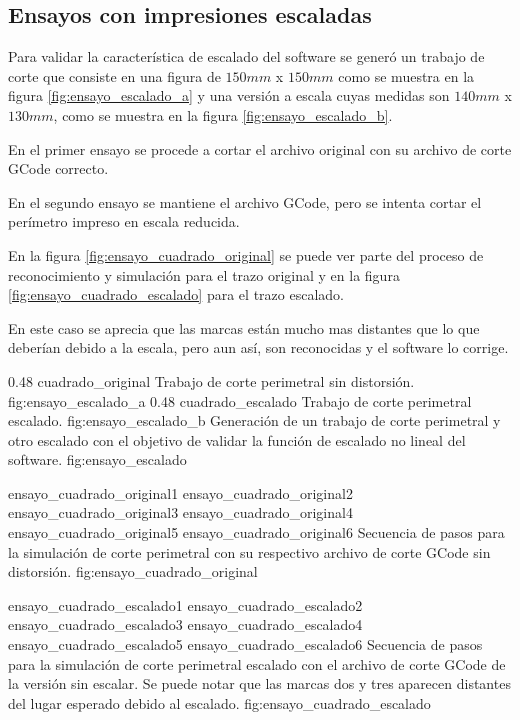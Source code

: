 \subsection{Ensayos con impresiones escaladas}

Para validar la característica de escalado del software se generó un trabajo de corte que consiste en una figura de $150mm$ x $150mm$ como se muestra en la figura \ref{fig:ensayo_escalado_a} y una versión a escala cuyas medidas son $140mm$ x $130mm$, como se muestra en la figura \ref{fig:ensayo_escalado_b}.\par
   En el primer ensayo se procede a cortar el archivo original con su archivo de corte GCode correcto. \par
   En el segundo ensayo se mantiene el archivo GCode, pero se intenta cortar el perímetro impreso en escala reducida.\par
   En la figura \ref{fig:ensayo_cuadrado_original} se puede ver parte del proceso de reconocimiento y simulación para el trazo original y en la figura \ref{fig:ensayo_cuadrado_escalado} para el trazo escalado.\par
   En este caso se aprecia que las marcas están mucho mas distantes que lo que deberían debido a la escala, pero aun así, son reconocidas y el software lo corrige.
   
   \subfigab
   {0.48} {cuadrado_original} {Trabajo de corte perimetral sin distorsión.} {fig:ensayo_escalado_a}
   {0.48} {cuadrado_escalado} {Trabajo de corte perimetral escalado.} {fig:ensayo_escalado_b}
   {Generación de un trabajo de corte perimetral y otro escalado con el objetivo de validar la función de escalado no lineal del software. }
   {fig:ensayo_escalado}

   \subfigthreethree
      {ensayo_cuadrado_original1}
      {ensayo_cuadrado_original2}
      {ensayo_cuadrado_original3}
      {ensayo_cuadrado_original4}
      {ensayo_cuadrado_original5}
      {ensayo_cuadrado_original6}
      {Secuencia de pasos para la simulación de corte perimetral con su respectivo archivo de corte GCode sin distorsión.}
      {fig:ensayo_cuadrado_original}


   \subfigthreethree
      {ensayo_cuadrado_escalado1}
      {ensayo_cuadrado_escalado2}
      {ensayo_cuadrado_escalado3}
      {ensayo_cuadrado_escalado4}
      {ensayo_cuadrado_escalado5}
      {ensayo_cuadrado_escalado6}
      {Secuencia de pasos para la simulación de corte perimetral escalado con el archivo de corte GCode de la versión sin escalar. Se puede notar que las marcas dos y tres aparecen distantes del lugar esperado debido al escalado.}
      {fig:ensayo_cuadrado_escalado}


